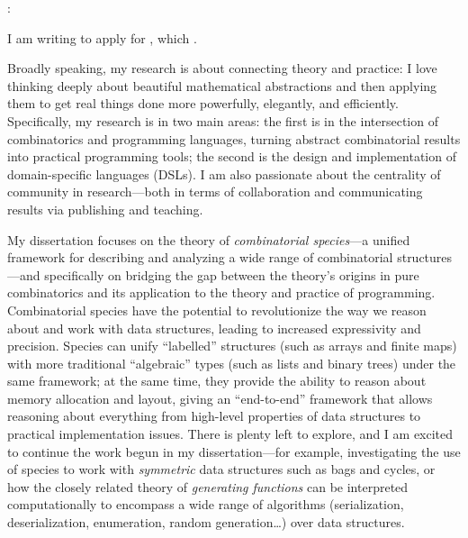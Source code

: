\begin{letter}{\thereaddress}

\opening{\salutation:}

I am writing to apply for \position, which \foundon.  \opportunity

\ifresearch
Broadly speaking, my research is about connecting theory and practice:
I love thinking deeply about beautiful mathematical abstractions and
then applying them to get real things done more powerfully, elegantly,
and efficiently.  Specifically, my research is in two main areas: the
first is in the intersection of combinatorics and programming
languages, turning abstract combinatorial results into practical
programming tools; the second is the design and implementation of
domain-specific languages (DSLs). I am also passionate about the
centrality of community in research---both in terms of collaboration
and communicating results via publishing and teaching.

My dissertation focuses on the theory of \emph{combinatorial
  species}---a unified framework for describing and analyzing a wide
range of combinatorial structures---and specifically on bridging the
gap between the theory's origins in pure combinatorics and its
application to the theory and practice of programming.  Combinatorial
species have the potential to revolutionize the way we reason about
and work with data structures, leading to increased expressivity and
precision.  Species can unify ``labelled'' structures (such as arrays
and finite maps) with more traditional ``algebraic'' types (such as
lists and binary trees) under the same framework; at the same time,
they provide the ability to reason about memory allocation and layout,
giving an ``end-to-end'' framework that allows reasoning about
everything from high-level properties of data structures to practical
implementation issues.  There is plenty left to explore, and I am
excited to continue the work begun in my dissertation---for example,
investigating the use of species to work with \emph{symmetric} data
structures such as bags and cycles, or how the closely related theory
of \emph{generating functions} can be interpreted computationally to
encompass a wide range of algorithms (serialization, deserialization,
enumeration, random generation\dots) over data structures.


\end{letter}
